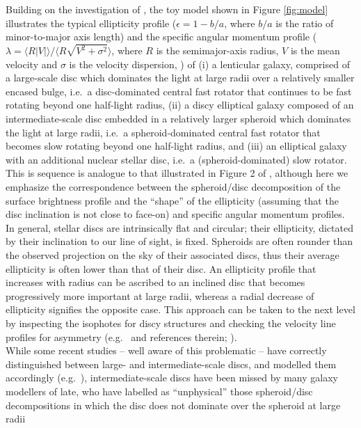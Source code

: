 \documentclass[useAMS,usenatbib,article]{mnras}
\begin{document}
{Building on the investigation of \cite{rixwhite1990}, 
the toy model shown in Figure \ref{fig:model} illustrates the typical ellipticity profile 
($\epsilon = 1 - b/a$, where $b/a$ is the ratio of minor-to-major axis length) 
and the specific angular momentum profile 
($\lambda = \langle R |V| \rangle / \langle R \sqrt{V^2 + \sigma^2} \rangle$, 
where $R$ is the semimajor-axis radius, $V$ is the mean velocity and $\sigma$ is the velocity dispersion, \citealt{emsellem2007}) 
of 
(i) a lenticular galaxy, 
comprised of a large-scale disc which dominates the light at large radii over a relatively smaller encased bulge,  
i.e.~a disc-dominated central fast rotator that continues to be fast rotating beyond one half-light radius, 
(ii) a discy elliptical galaxy \citep{kormendybender1996} 
composed of an intermediate-scale disc embedded in a relatively larger spheroid which dominates the light at large radii,
i.e.~a spheroid-dominated central fast rotator that becomes slow rotating beyond one half-light radius, and  
(iii) an elliptical galaxy with an additional nuclear stellar disc, 
i.e.~a (spheroid-dominated) slow rotator. 
This is sequence is analogue to that illustrated in Figure 2 of \cite{cappellari2011}, 
although here we emphasize the correspondence between the spheroid/disc decomposition of the surface brightness profile 
and the ``shape'' of the ellipticity (assuming that the disc inclination is not close to face-on) and specific angular momentum profiles. 
In general, stellar discs are intrinsically flat and circular; 
their ellipticity, dictated by their inclination to our line of sight, is fixed. 
Spheroids are often rounder than the observed projection on the sky of their associated discs, 
thus their average ellipticity is often lower than that of their disc. 
An ellipticity profile that increases with radius can be ascribed to an inclined disc that becomes progressively more important at large radii, 
whereas a radial decrease of ellipticity signifies the opposite case. 
This approach can be taken to the next level by inspecting the isophotes for discy structures and checking the velocity line profiles for asymmetry 
(e.g.~\citealt{scorzabender1995} and references therein; \citealt{scorza1998}). \\
While some recent studies -- well aware of this problematic -- have correctly distinguished between large- and intermediate-scale discs, 
and modelled them accordingly (e.g.~\citealt{kormendybender2012,krajnovic2013}), 
intermediate-scale discs have been missed by many galaxy modellers of late, 
who have labelled as ``unphysical'' \citep{allen2006} those spheroid/disc decompositions in which the disc does not dominate over the spheroid at large radii 
}
\end{document}
